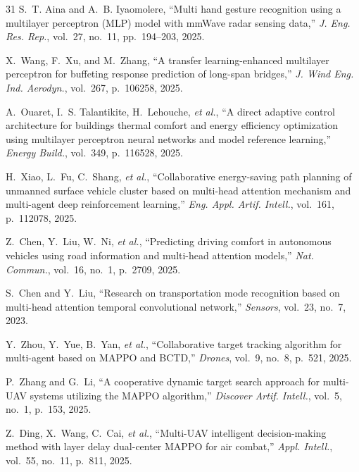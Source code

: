 \documentclass[conference]{IEEEtran}
\newcommand{\etal}{\textit{et al.}}
\begin{document}
{\begin{thebibliography}{31}
S.~T. Aina and A.~B. Iyaomolere,
``Multi hand gesture recognition using a multilayer perceptron
(MLP) model with mmWave radar sensing data,''
\emph{J. Eng. Res. Rep.}, vol.~27, no.~11, pp.~194--203, 2025.

X.~Wang, F.~Xu, and M.~Zhang,
``A transfer learning-enhanced multilayer perceptron for buffeting
response prediction of long-span bridges,''
\emph{J. Wind Eng. Ind. Aerodyn.}, vol.~267, p.~106258, 2025.

A.~Ouaret, I.~S. Talantikite, H.~Lehouche, \etal,
``A direct adaptive control architecture for buildings thermal
comfort and energy efficiency optimization using multilayer
perceptron neural networks and model reference learning,''
\emph{Energy Build.}, vol.~349, p.~116528, 2025.

H.~Xiao, L.~Fu, C.~Shang, \etal,
``Collaborative energy-saving path planning of unmanned surface
vehicle cluster based on multi-head attention mechanism and
multi-agent deep reinforcement learning,''
\emph{Eng. Appl. Artif. Intell.}, vol.~161, p.~112078, 2025.

Z.~Chen, Y.~Liu, W.~Ni, \etal,
``Predicting driving comfort in autonomous vehicles using road
information and multi-head attention models,''
\emph{Nat. Commun.}, vol.~16, no.~1, p.~2709, 2025.

S.~Chen and Y.~Liu,
``Research on transportation mode recognition based on multi-head
attention temporal convolutional network,''
\emph{Sensors}, vol.~23, no.~7, 2023.

Y.~Zhou, Y.~Yue, B.~Yan, \etal,
``Collaborative target tracking algorithm for multi-agent based
on MAPPO and BCTD,''
\emph{Drones}, vol.~9, no.~8, p.~521, 2025.

P.~Zhang and G.~Li,
``A cooperative dynamic target search approach for multi-UAV
systems utilizing the MAPPO algorithm,''
\emph{Discover Artif. Intell.}, vol.~5, no.~1, p.~153, 2025.

Z.~Ding, X.~Wang, C.~Cai, \etal,
``Multi-UAV intelligent decision-making method with layer delay
dual-center MAPPO for air combat,''
\emph{Appl. Intell.}, vol.~55, no.~11, p.~811, 2025.

\end{thebibliography}
}
\end{document}
